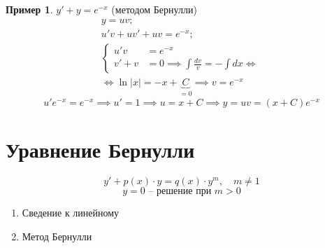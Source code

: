 \documentclass[11pt,a4paper,oneside]{report}
\theoremstyle{definition}
\newtheorem{example}{Пример}
\theoremstyle{plain}
\theoremstyle{remark}
\begin{document}
\begin{example}
    $y' + y = e^{-x}$ (методом Бернулли)
    \begin{align*}
        y = uv;                                                        \\
        u'v + uv' + uv = e^{-x};                                       \\
        \left\{\begin{array}{rl}
                   u'v    & = e^{-x}                                       \\
                   v' + v & = 0 \implies \int \frac{dv}{v} = -\int dx \iff
               \end{array}\right. \\
        \iff \ln|x| = -x + \underbrace{C}_{=0} \implies v = e^{-x}
    \end{align*}
    \begin{equation*}
        u'e^{-x} = e^{-x} \implies u' =1 \implies u = x+C \implies y = uv = (x + C)e^{-x}
    \end{equation*}
\end{example}

\section{Уравнение Бернулли}

\begin{equation*}
    y'+p(x) \cdot y = q(x)\cdot y^m, \quad m\ne 1
\end{equation*}
\begin{equation*}
    y = 0\text{ -- решение при }m > 0
\end{equation*}

\begin{enumerate}
    \item Сведение к линейному
    \item Метод Бернулли
\end{enumerate}
\end{document}
